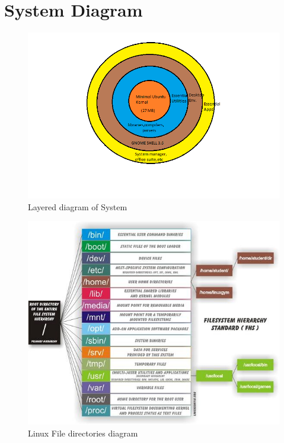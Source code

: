 \chapter{System Diagram}
\begin{figure}[h]
\begin{center}
  \includegraphics [scale=0.8] {core.png}
  \caption[System Ovierview]{Layered diagram of System}
\end{center}
\end{figure}
\begin{figure}[h]
\begin{center}
  \includegraphics [scale=0.55] {dir.jpg}
  \caption[FIle system Diagram]{Linux File directories diagram}
\end{center}
\end{figure}

